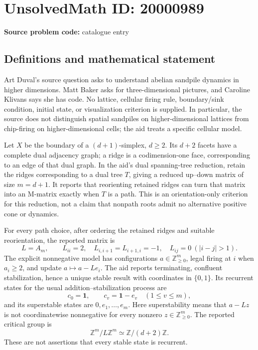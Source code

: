 \documentclass[11pt]{article}
\newcommand{\Z}{\mathbb{Z}}
\begin{document}
\section*{UnsolvedMath ID: 20000989}
\textbf{Source problem code:} catalogue entry
\subsection{Definitions and mathematical statement}
Art Duval's source question asks to understand abelian sandpile dynamics in higher dimensions. Matt Baker asks for three-dimensional pictures, and Caroline Klivans says she has code. No lattice, cellular firing rule, boundary/sink condition, initial state, or visualization criterion is supplied. In particular, the source does not distinguish spatial sandpiles on higher-dimensional lattices from chip-firing on higher-dimensional cells; the aid treats a specific cellular model.

Let \(X\) be the boundary of a \((d+1)\)-simplex, \(d\ge2\). Its \(d+2\) facets have a complete dual adjacency graph; a ridge is a codimension-one face, corresponding to an edge of that dual graph. In the aid's dual spanning-tree reduction, retain the ridges corresponding to a dual tree \(T\), giving a reduced up--down matrix of size \(m=d+1\). It reports that reorienting retained ridges can turn that matrix into an M-matrix exactly when \(T\) is a path. This is an orientation-only criterion for this reduction, not a claim that nonpath roots admit no alternative positive cone or dynamics.

For every path choice, after ordering the retained ridges and suitable reorientation, the reported matrix is
\[
 L=A_m,\qquad L_{ii}=2,\quad L_{i,i+1}=L_{i+1,i}=-1,
 \quad L_{ij}=0\ (|i-j|>1).
\]
The explicit nonnegative model has configurations \(a\in\Z_{\ge0}^m\), legal firing at \(i\) when \(a_i\ge2\), and update \(a\mapsto a-Le_i\). The aid reports terminating, confluent stabilization, hence a unique stable result with coordinates in \(\{0,1\}\). Its recurrent states for the usual addition--stabilization process are
\[
 c_0=\mathbf1,\qquad c_v=\mathbf1-e_v\quad(1\le v\le m),
\]
and its superstable states are \(0,e_1,\ldots,e_m\). Here superstability means that \(a-Lz\) is not coordinatewise nonnegative for every nonzero \(z\in\Z_{\ge0}^m\). The reported critical group is
\[
 \Z^m/L\Z^m\simeq\Z/(d+2)\Z.
\]
These are not assertions that every stable state is recurrent.
\end{document}
